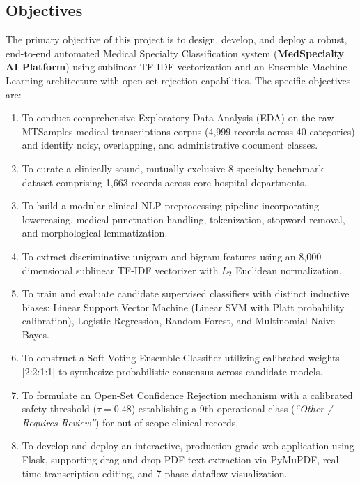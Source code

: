 \subsection{Objectives}
The primary objective of this project is to design, develop, and deploy a robust, end-to-end automated Medical Specialty Classification system (\textbf{MedSpecialty AI Platform}) using sublinear TF-IDF vectorization and an Ensemble Machine Learning architecture with open-set rejection capabilities. The specific objectives are:
\begin{enumerate}
    \item To conduct comprehensive Exploratory Data Analysis (EDA) on the raw MTSamples medical transcriptions corpus (4,999 records across 40 categories) and identify noisy, overlapping, and administrative document classes.
    \item To curate a clinically sound, mutually exclusive 8-specialty benchmark dataset comprising 1,663 records across core hospital departments.
    \item To build a modular clinical NLP preprocessing pipeline incorporating lowercasing, medical punctuation handling, tokenization, stopword removal, and morphological lemmatization.
    \item To extract discriminative unigram and bigram features using an 8,000-dimensional sublinear TF-IDF vectorizer with $L_2$ Euclidean normalization.
    \item To train and evaluate candidate supervised classifiers with distinct inductive biases: Linear Support Vector Machine (Linear SVM with Platt probability calibration), Logistic Regression, Random Forest, and Multinomial Naive Bayes.
    \item To construct a Soft Voting Ensemble Classifier utilizing calibrated weights [2:2:1:1] to synthesize probabilistic consensus across candidate models.
    \item To formulate an Open-Set Confidence Rejection mechanism with a calibrated safety threshold ($\tau = 0.48$) establishing a 9th operational class (\textit{``Other / Requires Review''}) for out-of-scope clinical records.
    \item To develop and deploy an interactive, production-grade web application using Flask, supporting drag-and-drop PDF text extraction via PyMuPDF, real-time transcription editing, and 7-phase dataflow visualization.
\end{enumerate}

